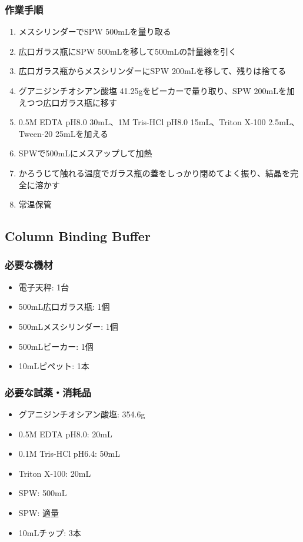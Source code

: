 \documentclass[titlepage,10pt,a4paper,uplatex]{jsbook}
\begin{document}
\subsubsection{作業手順}
\begin{enumerate}
\item メスシリンダーでSPW 500mLを量り取る
\item 広口ガラス瓶にSPW 500mLを移して500mLの計量線を引く
\item 広口ガラス瓶からメスシリンダーにSPW 200mLを移して、残りは捨てる
\item グアニジンチオシアン酸塩 41.25gをビーカーで量り取り、SPW 200mLを加えつつ広口ガラス瓶に移す
\item 0.5M EDTA pH8.0 30mL、1M Tris-HCl pH8.0 15mL、Triton X-100 2.5mL、Tween-20 25mLを加える
\item SPWで500mLにメスアップして加熱
\item かろうじて触れる温度でガラス瓶の蓋をしっかり閉めてよく振り、結晶を完全に溶かす
\item 常温保管
\end{enumerate}

\subsection{Column Binding Buffer}

\subsubsection{必要な機材}
\begin{itemize}
\item 電子天秤: 1台
\item 500mL広口ガラス瓶: 1個
\item 500mLメスシリンダー: 1個
\item 500mLビーカー: 1個
\item 10mLピペット: 1本
\end{itemize}

\subsubsection{必要な試薬・消耗品}
\begin{itemize}
\item グアニジンチオシアン酸塩: 354.6g
\item 0.5M EDTA pH8.0: 20mL
\item 0.1M Tris-HCl pH6.4: 50mL
\item Triton X-100: 20mL
\item SPW: 500mL
\item SPW: 適量
\item 10mLチップ: 3本
\end{itemize}
\end{document}
